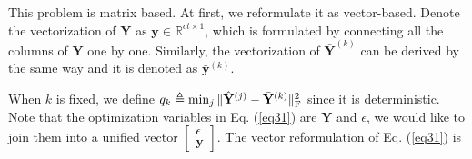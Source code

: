 \documentclass[10pt,journal,compsoc]{IEEEtran}
\begin{document}
This problem is matrix based. At first, we reformulate it as vector-based. Denote the vectorization of $\mathbf{Y}$ as $\mathbf{y} \in \mathbb{R}^{ct\times 1}$, which is formulated by connecting all the columns of $\mathbf{Y}$ one by one. Similarly, the vectorization of $\bar{\mathbf{Y}}^{(k)}$ can be derived by the same way and it is denoted as $\bar{\mathbf{y}}^{(k)}$.

When $k$ is fixed, we define $ q_k \triangleq \min_j \|\hat{\mathbf{Y}}^{(j)}- \bar{\mathbf{Y}}^{(k)}\|_{\rm{F}}^2$ since it is deterministic. Note that the optimization variables in Eq. (\ref{eq31}) are $\mathbf{Y}$ and $\epsilon$, we would like to join them into a unified vector
$\left[ {\begin{array}{*{10}{c}}
\epsilon \\
\mathbf{y}
\end{array}} \right]$.
The vector reformulation of Eq. (\ref{eq31}) is
\end{document}
